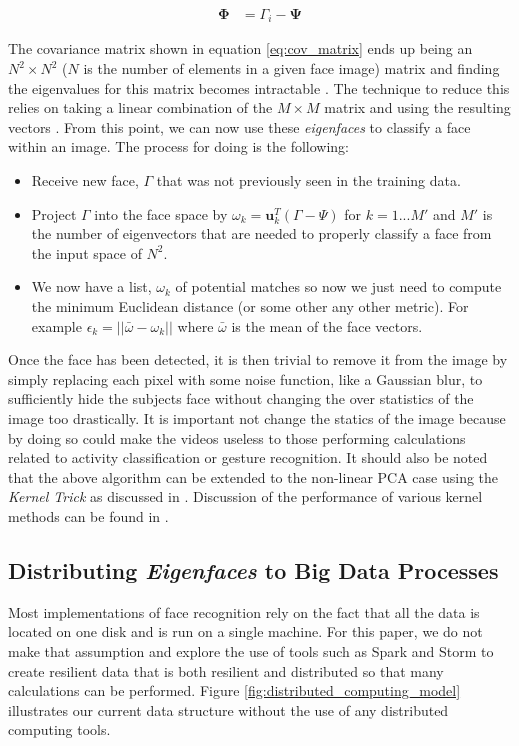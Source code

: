\documentclass[
	submission,
	final,
	notitlepage,
	narroweqnarray,
	inline,
	twoside,
	]{ieee}
\begin{document}
\begin{align}
  \mathbf{\Phi} &= \Gamma_i - \mathbf{\Psi} \label{eq:subtract_bias}
\end{align}

The covariance matrix shown in equation \ref{eq:cov_matrix} ends up
being an $N^2 \times N^2$ ($N$ is the number of elements in a given 
face image) matrix and finding the eigenvalues for 
this matrix becomes intractable \cite{eigen_face_recognition}. The 
technique to reduce this relies on taking a linear combination of the 
$M \times M$ matrix and using the resulting vectors \cite{turk_eigen_faces}.
From this point, we can now use these \textit{eigenfaces} to classify
a face within an image. The process for doing is the following: 
\begin{itemize}
  \item Receive new face, $\Gamma$ that was not previously seen in the
    training data. 
  \item Project $\Gamma$ into the face space by $\omega_k = \mathbf{u}_k^T (\Gamma - \Psi)$
    for $k = 1 ... M'$ and $M'$ is the number of eigenvectors that are 
    needed to properly classify a face from the input space of $N^2$.
  \item We now have a list, $\omega_k$ of potential matches so now we just need
    to compute the minimum Euclidean distance (or some other any other metric). 
    For example $\epsilon_k = ||\bar{\omega} - \omega_k ||$ where $\bar{\omega}$
    is the mean of the face vectors. 
\end{itemize}

Once the face has been detected, it is then trivial to remove it
from the image by simply replacing each pixel with some noise function, 
like a Gaussian blur, to sufficiently hide the subjects face without
changing the over statistics of the image too drastically. It is
important not change the statics of the image because by doing so
could make the videos useless to those performing calculations 
related to activity classification or gesture recognition. It should 
also be noted that the above algorithm can be extended to the non-linear
PCA case using the \textit{Kernel Trick} as discussed in \cite{face_kpca}. 
Discussion of the performance of various kernel methods can be found in 
\cite{kernel_learning}.

\subsection{Distributing \textit{Eigenfaces} to Big Data Processes}
Most implementations of face recognition rely on the fact that
all the data is located on one disk and is run on a single machine. 
For this paper, we do not make that assumption and explore the use
of tools such as Spark \cite{spark} and Storm \cite{storm} to create
resilient data that is both resilient and distributed so that many 
calculations can be performed. Figure \ref{fig:distributed_computing_model} 
illustrates our current data structure without the use of any
distributed computing tools.
\end{document}
